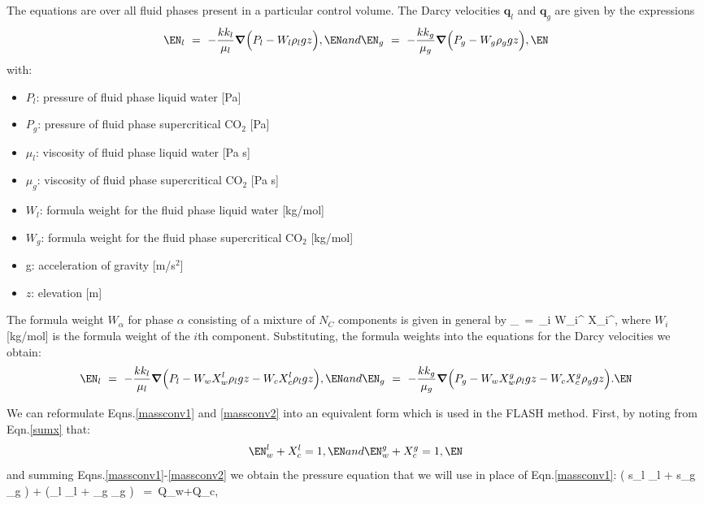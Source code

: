 \documentclass[12pt]{article}
\def\EQ#1\EN{\begin{equation}#1\end{equation}}
\newcommand{\eq}{\ =\ }
\newcommand{\p}{{\partial}}
\renewcommand{\a}{{\alpha}}
\newcommand{\bnabla}{\boldsymbol{\nabla}}
\newcommand{\bq}{\boldsymbol{q}}
\begin{document}
The equations are over all fluid phases present in a particular control volume. 
The Darcy velocities $\bq_l$ and $\bq_g$ are given by the expressions
\begin{subequations}
\EQ
\bq_l \eq -\frac{kk_l}{\mu_l} \bnabla \Big(P_l - W_l\rho_l g z\Big),
\EN
and
\EQ
\bq_g \eq -\frac{kk_g}{\mu_g} \bnabla \Big(P_g - W_g\rho_g g z\Big),
\EN
\end{subequations}
with:
\begin{itemize}
\item  $P_l$: pressure of fluid phase liquid water [Pa]
\item  $P_g$: pressure of fluid phase supercritical CO$_2$ [Pa]
\item $\mu_l$: viscosity of fluid phase liquid water [Pa s]
\item $\mu_g$: viscosity of fluid phase supercritical CO$_2$ [Pa s]
\item $W_l$: formula weight for the fluid phase liquid water [kg/mol]
\item $W_g$: formula weight for the fluid phase supercritical CO$_2$ [kg/mol]
\item g: acceleration of gravity [m/s$^2$]
\item $z$: elevation [m]
\end{itemize}

The formula weight $W_\a$ for phase $\a$ consisting of a mixture of $N_C$ components is given in general by
\EQ
W_\a \eq \sum_i W_i^{} X_i^\a,
\EN
where $W_i$ [kg/mol] is the formula weight of the $i$th component. 
Substituting, the formula weights into the equations for the Darcy velocities we obtain:
\begin{subequations}
\EQ
\bq_l \eq -\frac{kk_l}{\mu_l} \bnabla \Big(P_l - W_w X_w^l \rho_l g z - W_c X_c^l \rho_l g z \Big),
\EN
and
\EQ
\bq_g \eq -\frac{kk_g}{\mu_g} \bnabla \Big(P_g - W_w X_w^g \rho_l g z - W_c X_c^g \rho_g g z \Big).
\EN
\end{subequations}

We can reformulate Eqns.\eqref{massconv1} and \eqref{massconv2} into an equivalent form which is used in the FLASH method. First, by noting from Eqn.\eqref{sumx} that:
\begin{subequations}
\EQ
X_w^l+X_c^l =1,
\EN
and
\EQ
X_w^g+X_c^g =1,
\EN
\end{subequations}
and summing Eqns.\eqref{massconv1}-\eqref{massconv2} we obtain the pressure equation that we will use in place of Eqn.\eqref{massconv1}:
\EQ\label{massconv3}
\frac{\p}{\p t} \varphi \big( s_l \rho_l + s_g \rho_g \big) + \bnabla\cdot(\bq_l \rho_l + \bq_g \rho_g ) \eq Q_w+Q_c,
\EN
\end{document}
